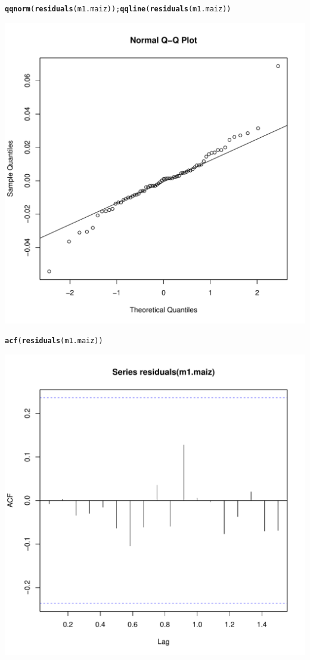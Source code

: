 \documentclass{article}\usepackage[]{graphicx}\usepackage[]{color}
\makeatletter
\def\maxwidth{ %
  \ifdim\Gin@nat@width>\linewidth
    \linewidth
  \else
    \Gin@nat@width
  \fi
}
\newcommand{\hlstd}[1]{\textcolor[rgb]{0.345,0.345,0.345}{#1}}%
\newcommand{\hlkwd}[1]{\textcolor[rgb]{0.737,0.353,0.396}{\textbf{#1}}}%
\newenvironment{kframe}{%
 \def\at@end@of@kframe{}%
 \ifinner\ifhmode%
  \def\at@end@of@kframe{\end{minipage}}%
  \begin{minipage}{\columnwidth}%
 \fi\fi%
 \def\FrameCommand##1{\hskip\@totalleftmargin \hskip-\fboxsep
 \colorbox{shadecolor}{##1}\hskip-\fboxsep
     \hskip-\linewidth \hskip-\@totalleftmargin \hskip\columnwidth}%
 \MakeFramed {\advance\hsize-\width
   \@totalleftmargin\z@ \linewidth\hsize
   \@setminipage}}%
 {\par\unskip\endMakeFramed%
 \at@end@of@kframe}
\newenvironment{knitrout}{}{} %
\makeatother
\begin{document}
\begin{knitrout}
\begin{kframe}\begin{alltt}
\hlkwd{qqnorm}\hlstd{(}\hlkwd{residuals}\hlstd{(m1.maiz));} \hlkwd{qqline}\hlstd{(}\hlkwd{residuals}\hlstd{(m1.maiz))}
\end{alltt}
\end{kframe}
\includegraphics[width=\maxwidth]{figure/unnamed-chunk-4-2} 
\begin{kframe}\begin{alltt}
\hlkwd{acf}\hlstd{(}\hlkwd{residuals}\hlstd{(m1.maiz))}
\end{alltt}
\end{kframe}
\includegraphics[width=\maxwidth]{figure/unnamed-chunk-4-3} 

\end{knitrout}
\end{document}
